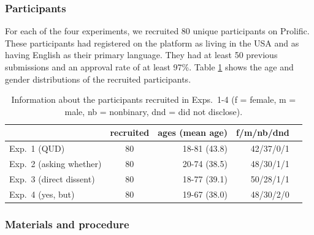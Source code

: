 \documentclass[times,linguex,xcolor]{glossa}
\begin{document}
  \subsubsection{Participants}

  For each of the four experiments, we recruited 80 unique participants on Prolific. These participants had registered on the platform as living in the USA and as having English as their primary language. They had at least 50 previous submissions and an approval rate of at least 97\%.  Table \ref{t:recruited} shows the age and gender distributions of the recruited participants.

  \begin{table}[h!]
  \centering
  \begin{tabular}{l | c | r r r }
              & recruited & ages (mean age) & f/m/nb/dnd \\ \hline
  Exp.~1 (QUD) & 80 & 18-81 (43.8) & 42/37/0/1  \\
  Exp.~2 (asking whether) & 80 & 20-74 (38.5)  & 48/30/1/1  \\
  Exp.~3 (direct dissent) & 80 & 18-77 (39.1) & 50/28/1/1  \\
  Exp.~4 (yes, but) &80 & 19-67 (38.0)  & 48/30/2/0 &  \\
  \hline
  \end{tabular}

  \caption{Information about the participants recruited in Exps.~1-4 (f = female, m = male, nb = nonbinary, dnd = did not disclose).}\label{t:recruited}
  \end{table}

  \subsubsection{Materials and procedure}
  
\end{document}
